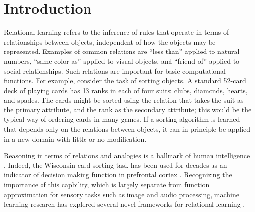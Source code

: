 \section{Introduction}
\label{sec:intro}

Relational learning refers to the inference of rules that operate in terms of
relationships between objects, independent of how the objects may be represented. Examples of common relations are
``less than'' applied to natural numbers, ``same color as'' applied to visual objects, and ``friend of'' applied to
social relationships. Such relations are important for basic computational functions.  For example, consider the task
of sorting objects. A standard 52-card deck of playing cards has 13 ranks in each of four suits: clubs, diamonds,
hearts, and spades. The cards might be sorted using the relation that takes the suit as the primary attribute,
and the rank as the secondary attribute; this would be the typical
way of ordering cards in many games. If a sorting algorithm is learned that depends 
only on the relations between objects, it can in principle be applied in a new domain with little 
or no modification. 

Reasoning in terms of relations and analogies is a hallmark of human intelligence 
\citep{snow,holyoak}.
Indeed, the Wisconsin card sorting task \citep{berg} has been used for decades as an indicator of decision making
function in prefrontal cortex \citep{monchi}.
Recognizing the importance of this
capbility,
which is largely separate from function approximation for sensory tasks such as image and audio processing, machine
learning research has explored several novel frameworks for relational learning \citep{TEM, NTM,episodicControl,esbn,mondal23learned,
battaglia,barrett:2018,santoro1}.

